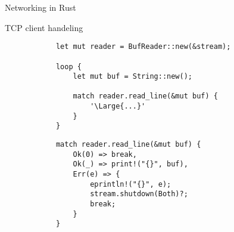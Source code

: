 \begin{frame}[fragile]{Networking in Rust}
    \begin{block}{TCP client handeling}
        \begin{overprint}
            \begin{verbatim}
            let mut reader = BufReader::new(&stream);
            
            loop {
                let mut buf = String::new();
            
                match reader.read_line(&mut buf) {
                    '\Large{...}'
                }
            }
            \end{verbatim}

            \begin{verbatim}
            match reader.read_line(&mut buf) {
                Ok(0) => break,
                Ok(_) => print!("{}", buf),
                Err(e) => {
                    eprintln!("{}", e);
                    stream.shutdown(Both)?;
                    break;
                }
            }
            \end{verbatim}
        \end{overprint}
    \end{block}
\end{frame}
